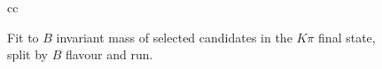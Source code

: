 \begin{figure}[h]
\begin{tabular}{cc}
         \\
    \end{tabular}
    \caption{Fit to $B$ invariant mass of selected candidates in the $K\pi$ final state, split by $B$ flavour and run.}
\label{fig:data_fit_Kpi}
\end{figure}

